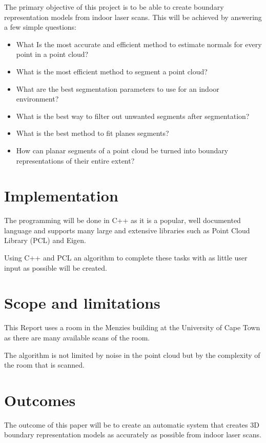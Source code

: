 		The primary objective of this project is to be able to create boundary representation models from indoor laser scans. This will be achieved by answering a few simple questions:
		
		\begin{itemize}
			\item What Is the most accurate and efficient method to estimate normals for every point in a point cloud?
			
			\item What is the most efficient method to segment a point cloud?
			
			\item What are the best segmentation parameters to use for an indoor environment?
			
			\item What is the best way to filter out unwanted segments after segmentation?
			
			\item What is the best method to fit planes segments?
			
			\item How can planar segments of a point cloud be turned into boundary representations of their entire extent?
			
		\end{itemize}
	
	\section{Implementation}
	
		The programming will be done in C++ as it is a popular, well documented language and supports many large and extensive libraries such as Point Cloud Library (PCL) and Eigen. 
		
		Using C++ and PCL an algorithm to complete these tasks with as little user input as possible will be created.
	
	\section{Scope and limitations}
		This Report uses a room in the Menzies building at the University of Cape Town as there are many available scans of the room.
		
		The algorithm is not limited by noise in the point cloud but by the complexity of the room that is scanned. 
	
	
	\section{Outcomes}
	
		The outcome of this paper will be to create an automatic system that creates 3D boundary representation models as accurately as possible from indoor laser scans.
	
	
	
	



